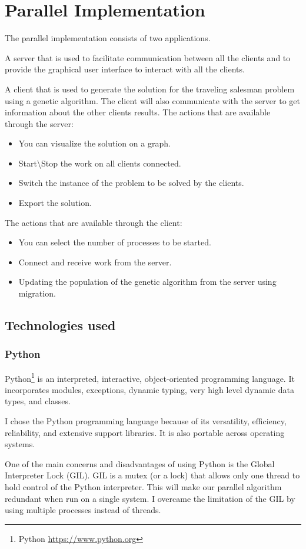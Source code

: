 \chapter{Parallel Implementation}
The parallel implementation consists of two applications.
\par
A server that is used to facilitate communication between all the clients and to provide the graphical user interface to interact with all the clients.
\par
A client that is used to generate the solution for the traveling salesman problem using a genetic algorithm. The client will also communicate with the server to get information about the other clients results.
\newline
The actions that are available through the server:
\begin{itemize}
  \item You can visualize the solution on a graph.
  \item Start\textbackslash Stop the work on all clients connected.
  \item Switch the instance of the problem to be solved by the clients.
  \item Export the solution.
\end{itemize}
\bigskip
The actions that are available through the client:
\begin{itemize}
  \item You can select the number of processes to be started.
  \item Connect and receive work from the server.
  \item Updating the population of the genetic algorithm from the server using migration.
\end{itemize}
\bigskip

\section{Technologies used}
\subsection{Python}
Python\footnote{Python \url{https://www.python.org}} is an interpreted, interactive, object-oriented programming language. It incorporates modules, exceptions, dynamic typing, very high level dynamic data types, and classes.
\par
I chose the Python programming language because of its versatility, efficiency, reliability, and extensive support libraries. It is also portable across operating systems. 
\par
One of the main concerns and disadvantages of using Python is the Global Interpreter Lock (GIL). GIL is a mutex (or a lock) that allows only one thread to hold control of the Python interpreter. This will make our parallel algorithm redundant when run on a single system. I overcame the limitation of the GIL by using multiple processes instead of threads.
